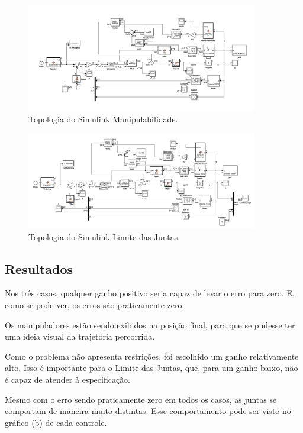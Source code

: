 \documentclass[a4paper,11pt]{article}
\theoremstyle{mytheor}
\begin{document}
\begin{figure}[!ht]
\centering
\includegraphics[width=0.9\textwidth]{figs/ex2_2a_simulink}
\caption{Topologia do Simulink Manipulabilidade.}
\label{fig:ex2_2a_simulink}
\end{figure}

\begin{figure}[!ht]
\centering
\includegraphics[width=0.9\textwidth]{figs/ex2_2b_simulink}
\caption{Topologia do Simulink Limite das Juntas.}
\label{fig:ex2_2b_simulink}
\end{figure}

\subsection{Resultados}

Nos três casos, qualquer ganho positivo seria capaz de levar o erro para zero. E, como se pode ver, os erros são praticamente zero.

Os manipuladores estão sendo exibidos na posição final, para que se pudesse ter uma ideia visual da trajetória percorrida.

Como o problema não apresenta restrições, foi escolhido um ganho relativamente alto. Isso é importante para o Limite das Juntas, que, para um ganho baixo, não é capaz de atender à especificação.

Mesmo com o erro sendo praticamente zero em todos os casos, as juntas se comportam de maneira muito distintas. Esse comportamento pode ser visto no gráfico (b) de cada controle.
\end{document}
